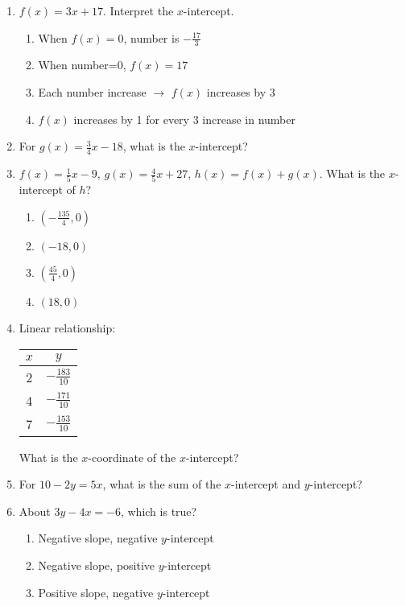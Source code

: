 \documentclass[12pt]{exam}
\begin{document}
\begin{enumerate}
    \item $f(x) = 3x + 17$. Interpret the $x$-intercept.
    \begin{enumerate}[label=\Alph*)]
        \item When $f(x)=0$, number is $-\frac{17}{3}$
        \item When number=0, $f(x)=17$
        \item Each number increase $\to$ $f(x)$ increases by 3
        \item $f(x)$ increases by 1 for every 3 increase in number
    \end{enumerate}
    \item For $g(x) = \frac{3}{4}x - 18$, what is the $x$-intercept?
    \item $f(x) = \frac{1}{5}x - 9$, $g(x) = \frac{4}{5}x + 27$, $h(x) = f(x) + g(x)$. What is the $x$-intercept of $h$?
    \begin{enumerate}[label=\Alph*)]
        \item $(-\frac{135}{4}, 0)$
        \item $(-18, 0)$
        \item $(\frac{45}{4}, 0)$
        \item $(18, 0)$
    \end{enumerate}
    \item Linear relationship:
    \begin{center}
        \begin{tabular}{|c|c|}
            \hline
            $x$ & $y$ \\
            \hline
            2 & $-\frac{183}{10}$ \\
            4 & $-\frac{171}{10}$ \\
            7 & $-\frac{153}{10}$ \\
            \hline
        \end{tabular}
    \end{center}
    What is the $x$-coordinate of the $x$-intercept?
    \item For $10 - 2y = 5x$, what is the sum of the $x$-intercept and $y$-intercept?
    \item About $3y - 4x = -6$, which is true?
    \begin{enumerate}[label=\Alph*)]
        \item Negative slope, negative $y$-intercept
        \item Negative slope, positive $y$-intercept
        \item Positive slope, negative $y$-intercept

\end{enumerate}
\end{enumerate}
\end{document}
